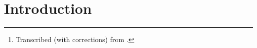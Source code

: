 
\maketitle%

\begin{abstract}
\noindent
The objective of this lab is to determine the rate constant and collision diameter of a diffusion-controlled reaction (photoexcited anthracene with carbon tetrabromide, ) using the technique of fluorescence quenching.\thanks{Transcribed (with corrections) from \textcite{halpern97}.}
\end{abstract}



\section{Introduction} %
\label{sec:intro}

